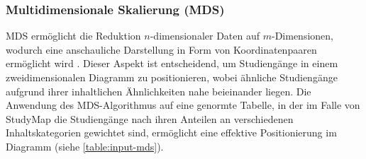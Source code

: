 \subsubsection{Multidimensionale Skalierung (MDS)}\label{sec:MDS}
MDS ermöglicht die Reduktion $n$-dimensionaler Daten auf $m$-Dimensionen,
wodurch eine anschauliche Darstellung in Form von Koordinatenpaaren
ermöglicht wird \parencite{intro-to-multidimensional-scaling}. Dieser Aspekt ist
entscheidend, um Studiengänge in einem zweidimensionalen Diagramm zu
positionieren, wobei ähnliche Studiengänge aufgrund ihrer inhaltlichen
Ähnlichkeiten nahe beieinander liegen. Die Anwendung des MDS-Algorithmus auf
eine genormte Tabelle, in der im Falle von StudyMap die Studiengänge nach ihren
Anteilen an verschiedenen Inhaltskategorien gewichtet sind, ermöglicht eine
effektive Positionierung im Diagramm (siehe \autoref{table:input-mds}).


